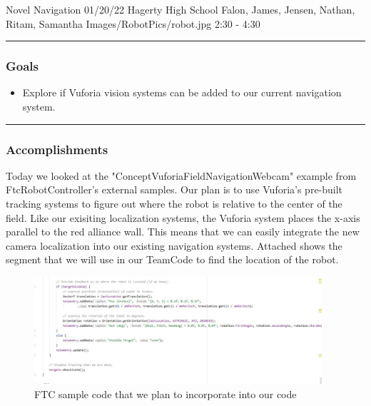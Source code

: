 \insertmeeting 
	{Novel Navigation} 
	{01/20/22} 
	{Hagerty High School}
	{Falon, James, Jensen, Nathan, Ritam, Samantha}
	{Images/RobotPics/robot.jpg}
	{2:30 - 4:30}
	
\noindent\hfil\rule{\textwidth}{.4pt}\hfil
\subsubsection*{Goals}
\begin{itemize}
    \item Explore if Vuforia vision systems can be added to our current navigation system.  

\end{itemize} 

\noindent\hfil\rule{\textwidth}{.4pt}\hfil

\subsubsection*{Accomplishments}
Today we looked at the "ConceptVuforiaFieldNavigationWebcam" example from FtcRobotController's external samples. Our plan is to use Vuforia's pre-built tracking systems to figure out where the robot is relative to the center of the field. Like our exisiting localization systems, the Vuforia system places the x-axis parallel to the red alliance wall. This means that we can easily integrate the new camera localization into our existing navigation systems. Attached shows the segment that we will use in our TeamCode to find the location of the robot. 

\begin{figure}[htp]
\centering
\includegraphics[width=0.95\textwidth, angle=0]{Meetings/January/01-20-22/1.20.22 vuforia localization spot - James Hu.JPG}
\caption{FTC sample code that we plan to incorporate into our code}
\label{fig:012022_1}
\end{figure}



